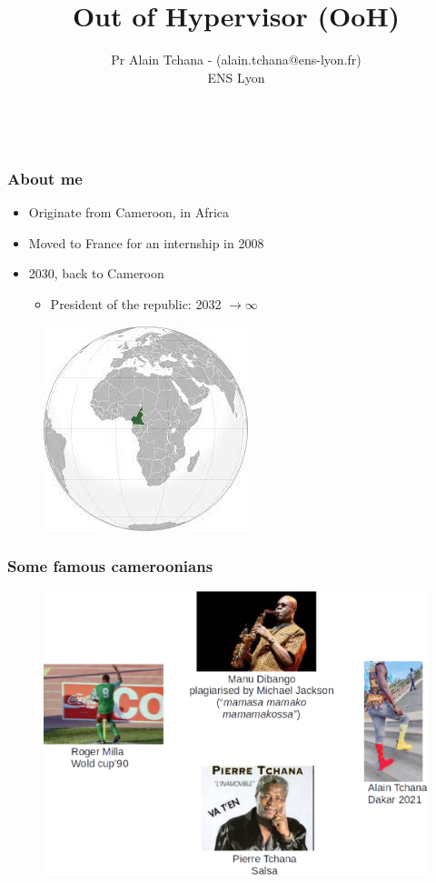 \documentclass[xcolor=table,bigger,unknownkeysallowed]{beamer}
\title{Out of Hypervisor (OoH)}
\author{Pr Alain Tchana - (alain.tchana@ens-lyon.fr)\\
ENS Lyon}
\date{~}
\institute{\vskip1ex EuroDW'22 - March, 5}
\begin{document}
\maketitle

        \begin{frame}
        \frametitle{About me} 
			\begin{itemize}
				\item Originate from Cameroon, in Africa
				\item Moved to France for an internship in 2008
				\item 2030, back to Cameroon
				\begin{itemize}
					\item President of the republic: 2032 $\rightarrow \infty$	
\end{itemize}					
			\end{itemize}
 		    \begin{figure}
			\centering
	\includegraphics[width=.3\columnwidth]{fig/cameroun.jpeg}
			\end{figure}	
        \end{frame}
        \begin{frame}
        \frametitle{Some famous cameroonians} 
 		    \begin{figure}
			\centering
	\includegraphics[width=.7\columnwidth]{fig/famous}
			\end{figure}			
        \end{frame}        
\end{document}
